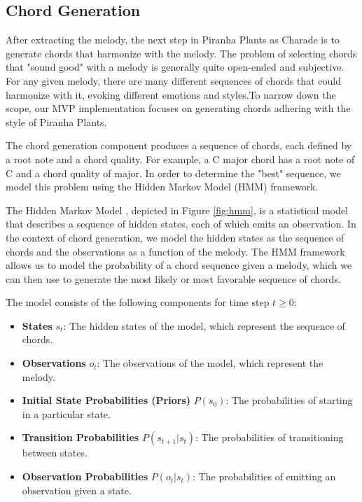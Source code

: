 \subsection{Chord Generation}
\label{sec:chord_generation}

After extracting the melody, the next step in Piranha Plants as Charade is to generate chords that harmonize with the melody. The problem of selecting chords that "sound good" with a melody is generally quite open-ended and subjective. For any given melody, there are many different sequences of chords that could harmonize with it, evoking different emotions and styles.To narrow down the scope, our MVP implementation focuses on generating chords adhering with the style of Piranha Plants.

The chord generation component produces a sequence of chords, each defined by a root note and a chord quality. For example, a C major chord has a root note of C and a chord quality of major. In order to determine the "best" sequence, we model this problem using the Hidden Markov Model (HMM) framework.

The Hidden Markov Model \autocite{HMM:2023}, depicted in Figure \ref{fig:hmm}, is a statistical model that describes a sequence of hidden states, each of which emits an observation. In the context of chord generation, we model the hidden states as the sequence of chords and the observations as a function of the melody. The HMM framework allows us to model the probability of a chord sequence given a melody, which we can then use to generate the most likely or most favorable sequence of chords.

The model consists of the following components for time step $t \geq 0$:
\begin{itemize}
    \item \textbf{States} $s_t$: The hidden states of the model, which represent the sequence of chords.
    \item \textbf{Observations} $o_t$: The observations of the model, which represent the melody.
    \item \textbf{Initial State Probabilities (Priors)} $P(s_0)$: The probabilities of starting in a particular state.
    \item \textbf{Transition Probabilities} $P(s_{t+1} | s_t)$: The probabilities of transitioning between states.
    \item \textbf{Observation Probabilities} $P(o_t | s_t)$: The probabilities of emitting an observation given a state.
\end{itemize}

